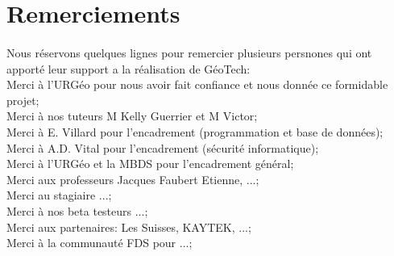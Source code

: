 \section{Remerciements}
\paragraph{}
Nous réservons quelques lignes pour remercier plusieurs persnones qui ont apporté leur support a la réalisation de GéoTech:\\
Merci à l'URGéo pour nous avoir fait confiance et nous donnée ce formidable projet;\\
Merci à nos tuteurs M Kelly Guerrier et M Victor;\\
Merci à  E. Villard pour l'encadrement (programmation et base de données);\\
Merci à A.D. Vital pour l'encadrement (sécurité informatique);\\
Merci à l'URGéo et la MBDS pour l'encadrement général;\\
Merci aux professeurs Jacques Faubert Etienne, ...;\\
Merci au stagiaire ...;\\
Merci à nos beta testeurs ...;\\
Merci aux partenaires: Les Suisses, KAYTEK, ...;\\
Merci à la communauté FDS pour ...;\\
